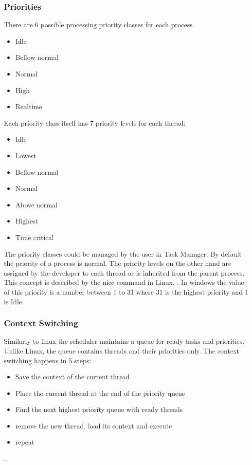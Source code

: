 \documentclass[journal,10pt,onecolumn,compsoc,letterpaper,draftclsnofoot,table,xcdraw]{IEEEtran} \usepackage[margin=0.75in]{geometry}
\begin{document}
\subsubsection{Priorities}
\noindent There are 6 possible processing priority classes for each process.
\begin{itemize}
\item Idle
\item Bellow normal
\item Normal
\item High
\item Realtime
\end{itemize}
\noindent Each priority class itself has 7 priority levels for each thread:
\begin{itemize}
\item Idle
\item Lowest
\item Bellow normal
\item Normal
\item Above normal
\item Highest
\item Time critical
\end{itemize}
\noindent The priority classes could be managed by the user in Task Manager. By default the priority of a process is normal. The priority levels on the other hand are assigned by the developer to each thread or is inherited from the parent process. This concept is described by the nice command in Linux. \cite{windowscpuscheduling}. In windows the value of this priority is a number between 1 to 31 where 31 is the highest priority and 1 is Idle.
\subsubsection{Context Switching}
\noindent Similarly to linux the scheduler maintains a queue for ready tasks and priorities. Unlike Linux, the queue contains threads and their priorities only. The context switching happens in  5 steps:
\begin{itemize}
\item Save the context of the current thread
\item Place the current thread at the end of the priority queue
\item Find the next highest priority queue with ready threads
\item remove the new thread, load its context and execute
\item repeat
\end{itemize}
\cite{winconsw}.
\end{document}
